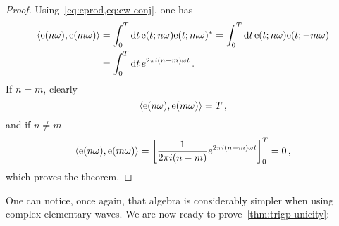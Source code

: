 \begin{proof}
  Using~\cref{eq:eprod,eq:cw-conj}, one has
  \begin{align}
    \braket{\mathrm{e}(n\omega),\mathrm{e}(m\omega)}&=\int_{0}^{T}\mathrm{d} t\,\mathrm{e}(t;n\omega)\mathrm{e}(t;m\omega)^*
    =\int_{0}^{T}\mathrm{d} t\,\mathrm{e}(t;n\omega)\mathrm{e}(t;-m\omega)\\
    &=\int_{0}^{T}\mathrm{d} t\,e^{2\pi i (n-m)\omega t}\,.
  \end{align}
  If $n=m$, clearly
  \begin{equation}
    \braket{\mathrm{e}(n\omega),\mathrm{e}(m\omega)}=T\,,
  \end{equation}
  and if $n\neq m$
  \begin{equation}
    \braket{\mathrm{e}(n\omega),\mathrm{e}(m\omega)}=
    \left[\frac{1}{2\pi i (n-m)}e^{2\pi i (n-m)\omega t}\right]_0^T=0\,,
  \end{equation}
  which proves the theorem.
\end{proof}
One can notice, once again, that algebra is considerably simpler when using complex
elementary waves. We are now ready to prove~\cref{thm:trigp-unicity}:
